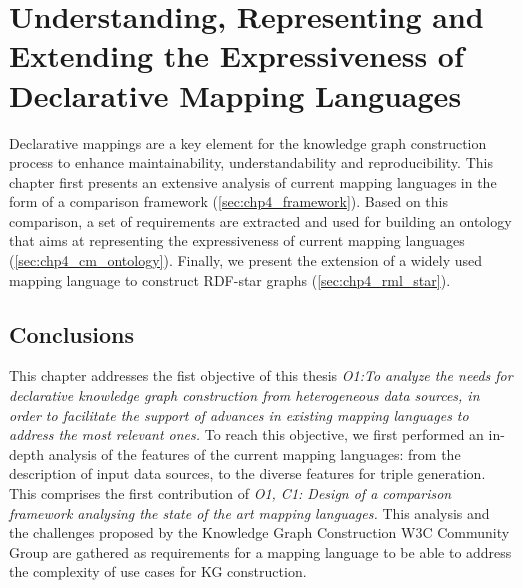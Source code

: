 
\chapter{Understanding, Representing and Extending the Expressiveness of Declarative Mapping Languages}
\label{chapter:mappings}

Declarative mappings are a key element for the knowledge graph construction process to enhance maintainability, understandability and reproducibility. This chapter first presents an extensive analysis of current mapping languages in the form of a comparison framework (\cref{sec:chp4_framework}). Based on this comparison, a set of requirements are extracted and used for building an ontology that aims at representing the expressiveness of current mapping languages (\cref{sec:chp4_cm_ontology}). Finally, we present the extension of a widely used mapping language to construct RDF-star graphs (\cref{sec:chp4_rml_star}).








\section{Conclusions}

This chapter addresses the fist objective of this thesis \textit{O1:To analyze the needs for declarative knowledge graph construction from heterogeneous data sources, in order to facilitate the support of advances in existing mapping languages to address the most relevant ones.} 
To reach this objective, we first performed an in-depth analysis of the features of the current mapping languages: from the description of input data sources, to the diverse features for triple generation. This comprises the first contribution of \textit{O1, C1: Design of a comparison framework analysing the state of the art mapping languages.}
This analysis and the challenges proposed by the Knowledge Graph Construction W3C Community Group are gathered as requirements for a mapping language to be able to address the complexity of use cases for KG construction. 

